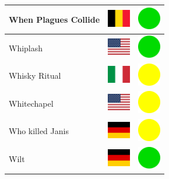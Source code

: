 \documentclass[12pt, a4paper, twoside]{report}
\begin{document}
\begin{center}
\begin{longtable}{|p{5cm}|p{2cm}|p{2cm}|}
 When Plagues Collide                                       & \includegraphics[width=1cm]{../4x3/be} &   \includegraphics[width=1cm]{../likes/y} \\ \hline
 Whiplash                                                   & \includegraphics[width=1cm]{../4x3/us} &   \includegraphics[width=1cm]{../likes/y} \\ \hline
 Whisky Ritual                                              & \includegraphics[width=1cm]{../4x3/it} &   \includegraphics[width=1cm]{../likes/m} \\ \hline
 Whitechapel                                                & \includegraphics[width=1cm]{../4x3/us} &   \includegraphics[width=1cm]{../likes/m} \\ \hline
 Who killed Janis                                           & \includegraphics[width=1cm]{../4x3/de} &   \includegraphics[width=1cm]{../likes/m} \\ \hline
 Wilt                                                       & \includegraphics[width=1cm]{../4x3/de} &   \includegraphics[width=1cm]{../likes/y} \\ \hline

\end{longtable}
\end{center}
\end{document}
